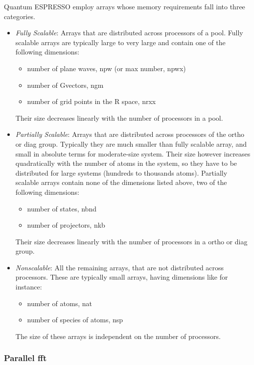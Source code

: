 \documentclass[12pt,a4paper]{article}
\begin{document}
Quantum ESPRESSO employ arrays whose memory requirements fall 
into three categories.
\begin{itemize}
\item {\em Fully Scalable}: 
Arrays that are distributed across processors of a pool.
Fully scalable arrays are typically large to very large and contain one 
of the following dimensions:
\begin{itemize}
\item number of plane waves, npw (or max number, npwx)
\item number of Gvectors, ngm
\item number of grid points in the R space, nrxx
\end{itemize}
Their size decreases linearly with the number of processors in a pool. 

\item {\em Partially Scalable}: 
Arrays that are distributed across processors of the
ortho or diag group. Typically they are much smaller than fully scalable
array, and small in absolute terms for moderate-size system. Their size
however increases quadratically with the number of atoms in the system,
so they have to be distributed for large systems (hundreds to thousands
atoms). Partially scalable arrays contain none of the dimensions listed 
above, two of the following dimensions:
\begin{itemize}
\item number of states, nbnd
\item number of projectors, nkb
\end{itemize}
Their size decreases linearly with the number of processors in a ortho
or diag group. 

\item
{\em Nonscalable}: All the remaining arrays, that are not distributed across
processors. These are typically small arrays, having dimensions like for
instance:
\begin{itemize}
\item number of atoms, nat
\item number of species of atoms, nsp
\end{itemize}
The size of these arrays is independent on the number of processors.
\end{itemize}

\subsubsection{ Parallel fft}
\end{document}
